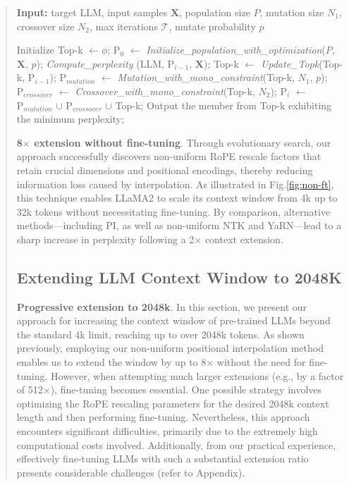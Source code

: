 \begin{abstract}
\begin{algorithm}[t]
	\small
	\caption{The search algorithm}
	\textbf{Input:} target LLM, input samples $\mathbf{X}$, population size $P$, mutation size $N_1$, crossover size $N_2$, max iterations $\mathcal{T}$, mutate probability $p$\\

	\begin{algorithmic}[1]
		\label{alg:search}
		\STATE Initialize Top-k $\leftarrow \phi$;
		\STATE $\text{P}_0$ $\leftarrow$ \textit{Initialize\_population\_with\_optimization}($P$, $\mathbf{X}$, $p$);
		\STATE \textit{Compute\_perplexity} (LLM, $\text{P}_{i-1}$, $\mathbf{X}$);
		\STATE Top-k $\leftarrow$ \textit{Update\_Topk}(Top-k, $\text{P}_{i-1}$);
		\STATE $\text{P}_{mutation}$ $\leftarrow$ \textit{Mutation\_with\_mono\_constraint}(Top-k, $N_1$, $p$);
		\STATE $\text{P}_{crossover}$ $\leftarrow$ \textit{Crossover\_with\_mono\_constraint}(Top-k, $N_2$);
		\STATE $\text{P}_i$ $\leftarrow$ $\text{P}_{mutation}$ $\cup$ $\text{P}_{crossover}$ $\cup$ Top-k;
		\ENDFOR
		\STATE Output the member from Top-k exhibiting the minimum perplexity;
	\end{algorithmic}
\end{algorithm}

\textbf{8$\times$ extension without fine-tuning}. Through evolutionary search, our approach successfully discovers non-uniform RoPE rescale factors that retain crucial dimensions and positional encodings, thereby reducing information loss caused by interpolation. As illustrated in Fig.\ref{fig:non-ft}, this technique enables LLaMA2 to scale its context window from 4k up to 32k tokens without necessitating fine-tuning. By comparison, alternative methods—including PI, as well as non-uniform NTK and YaRN—lead to a sharp increase in perplexity following a 2$\times$ context extension.

\subsection{Extending LLM Context Window to 2048K}
\label{sec:extendto2048k}

\textbf{Progressive extension to 2048k}. In this section, we present our approach for increasing the context window of pre-trained LLMs beyond the standard 4k limit, reaching up to over 2048k tokens. As shown previously, employing our non-uniform positional interpolation method enables us to extend the window by up to 8$\times$ without the need for fine-tuning. However, when attempting much larger extensions (e.g., by a factor of 512$\times$), fine-tuning becomes essential. One possible strategy involves optimizing the RoPE rescaling parameters for the desired 2048k context length and then performing fine-tuning. Nevertheless, this approach encounters significant difficulties, primarily due to the extremely high computational costs involved. Additionally, from our practical experience, effectively fine-tuning LLMs with such a substantial extension ratio presents considerable challenges (refer to Appendix).


\end{abstract}
